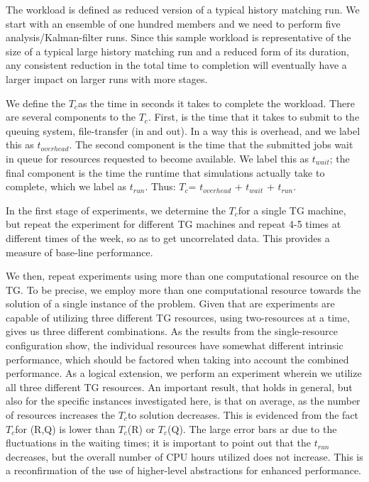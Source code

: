 \documentclass[conference,final]{IEEEtran}
\newcommand{\tc}{$T_c$}
\newcommand{\jhanote}[1]{ {\textcolor{red} { ***Jha: #1 }}}
\newcommand{\yyenote}[1]{ {\textcolor{blue} { ***yye00: #1 }}}
\newcommand{\jhanote}[1]{}
\newcommand{\yyenote}[1]{}
\begin{document}

The workload is defined as reduced version of a typical history
matching run. We start with an ensemble of one hundred members and we
need to perform five analysis/Kalman-filter runs. Since this sample
workload is representative of the size of a typical large history
matching run and a reduced form of its duration, any consistent
reduction in the total time to completion will eventually have a
larger impact on larger runs with more stages.

We define the \tc as the time in seconds it takes to complete the
workload. There are several components to the \tc. First, is the time
that it takes to submit to the queuing system, file-transfer (in and
out). In a way this is overhead, and we label this as $t_{overhead}$.
The second component is the time that the submitted jobs wait in queue
for resources requested to become available. We label this as
$t_{wait}$; the final component is the time the runtime that
simulations actually take to complete, which we label as
$t_{run}$. Thus: \tc = $t_{overhead}$ + $t_{wait}$ + $t_{run}$.

In the first stage of experiments, we determine the \tc for a single
TG machine, but repeat the experiment for different TG machines and
repeat 4-5 times at different times of the week, so as to get
uncorrelated data.  This provides a measure of base-line performance.

We then, repeat experiments using more than one computational resource
on the TG. To be precise, we employ more than one computational
resource towards the solution of a single instance of the problem.
Given that are experiments are capable of utilizing three different TG
resources, using two-resources at a time, gives us three different
combinations. As the results from the single-resource configuration
show, the individual resources have somewhat different intrinsic
performance, which should be factored when taking into account the
combined performance. As a logical extension, we perform an experiment
wherein we utilize all three different TG resources.  An important
result, that holds in general, but also for the specific instances
investigated here, is that on average, as the number of resources
increases the \tc to solution decreases. This is evidenced from the
fact \tc for (R,Q) is lower than \tc (R) or \tc (Q). The large error
bars ar due to the fluctuations in the waiting times; it is important
to point out that the $t_{run}$ decreases, but the overall number of
CPU hours utilized does not increase. This is a reconfirmation of
the use of higher-level abstractions for enhanced performance.
\end{document}
